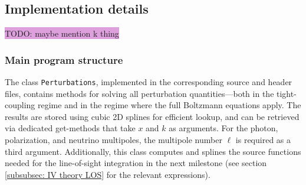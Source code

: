 \documentclass{aa}
\numberwithin{equation}{section}
\numberwithin{table}{section}
\numberwithin{figure}{section}
\begin{document}




\subsection{Implementation details}\label{subsec: III methods}

\colorbox{Plum}{TODO: maybe mention k thing}

\subsubsection{Main program structure}\label{subsubsec: III methods program}
The class \verb|Perturbations|, implemented in the corresponding source and header files, contains methods for solving all perturbation quantities—both in the tight-coupling regime and in the regime where the full Boltzmann equations apply. The results are stored using cubic 2D splines for efficient lookup, and can be retrieved via dedicated get-methods that take $x$ and $k$ as arguments. For the photon, polarization, and neutrino multipoles, the multipole number $\ell$ is required as a third argument. Additionally, this class computes and splines the source functions needed for the line-of-sight integration in the next milestone (see section \ref{subsubsec: IV theory LOS} for the relevant expressions).
\end{document}
